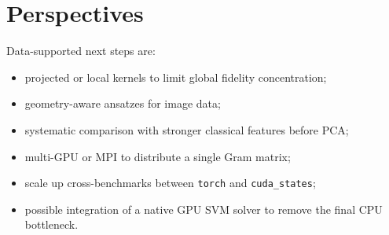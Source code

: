 \documentclass[10pt,twocolumn,letterpaper]{article}
\begin{document}
\section{Perspectives}
Data-supported next steps are:
\begin{itemize}
    \item projected or local kernels to limit global fidelity concentration;
    \item geometry-aware ansatzes for image data;
    \item systematic comparison with stronger classical features before PCA;
    \item multi-GPU or MPI to distribute a single Gram matrix;
    \item scale up cross-benchmarks between \texttt{torch} and \texttt{cuda\_states};
    \item possible integration of a native GPU SVM solver to remove the final CPU bottleneck.
\end{itemize}

{\small


}
\end{document}
